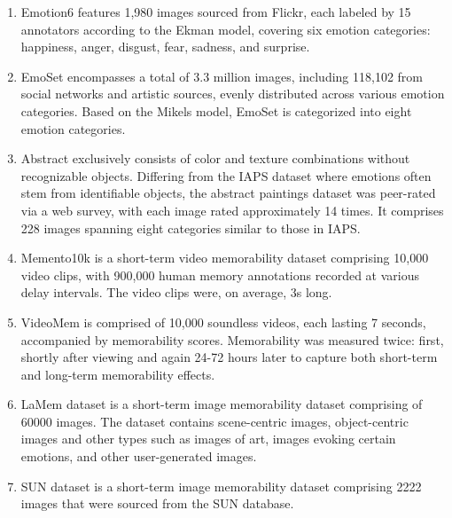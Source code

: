 \begin{enumerate}
            \item Emotion6 \cite{peng2015mixed} features 1,980 images sourced from Flickr, each labeled by 15 annotators according to the Ekman model, covering six emotion categories: happiness, anger, disgust, fear, sadness, and surprise.
            \item EmoSet \cite{yang2023emoset} encompasses a total of 3.3 million images, including 118,102 from social networks and artistic sources, evenly distributed across various emotion categories. Based on the Mikels model, EmoSet is categorized into eight emotion categories.
            \item Abstract \cite{machajdik2010affective} exclusively consists of color and texture combinations without recognizable objects. Differing from the IAPS dataset where emotions often stem from identifiable objects, the abstract paintings dataset was peer-rated via a web survey, with each image rated approximately 14 times. It comprises 228 images spanning eight categories similar to those in IAPS.


                     \item Memento10k\cite{newman2020multimodal} is a short-term video memorability dataset comprising 10,000 video clips,  with 900,000 human memory annotations recorded at various delay intervals. The video clips were, on average, 3s long.
            \item VideoMem \cite{cohendet2019videomem} is comprised of 10,000 soundless videos, each lasting 7 seconds, accompanied by memorability scores. Memorability was measured twice: first, shortly after viewing and again 24-72 hours later to capture both short-term and long-term memorability effects.
            \item LaMem \cite{khosla2015understanding} dataset is a short-term image memorability dataset comprising of 60000 images. The dataset contains scene-centric images, object-centric images and other types such as images
            of art, images evoking certain emotions, and other user-generated images.
            \item SUN \cite{isola2011makes} dataset is a short-term image memorability dataset comprising 2222 images that were sourced from the SUN database. 
   

\end{enumerate}
